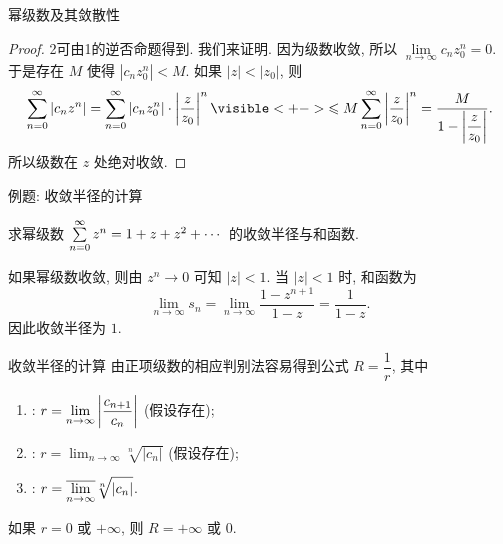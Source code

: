 \begin{frame}{幂级数及其敛散性}
\begin{center}
\end{center}
\onslide<+->
\begin{proof}
\enumnum2可由\enumnum1的逆否命题得到.
\onslide<+->
我们来证明. 因为级数收敛, 所以 $\lim\limits_{n\to\infty}c_n z_0^n=0$.
\onslide<+->
于是存在 $M$ 使得 $|c_nz_0^n|<M$.
\onslide<+->
如果 $|z|<|z_0|$, 则
\[\sum_{n=0}^\infty|c_nz^n|=\sum_{n=0}^\infty|c_nz_0^n|\cdot\abs{\frac z{z_0}}^n
\visible<+->{\le M\sum_{n=0}^\infty\abs{\frac z{z_0}}^n
=\frac{M}{1-\abs{\dfrac z{z_0}}}.}\]
\onslide<+->
所以级数在 $z$ 处绝对收敛.
\end{proof}
\end{frame}


\begin{frame}{例题: 收敛半径的计算}
\begin{example}
求幂级数 $\sum\limits_{n=0}^\infty z^n=1+z+z^2+\cdots$ 的收敛半径与和函数.
\end{example}
\begin{solution}
如果幂级数收敛, 则由 $z^n\to0$ 可知 $|z|<1$.
\onslide<+->
当 $|z|<1$ 时, 和函数为
\[\lim_{n\to\infty}s_n=\lim_{n\to\infty}\frac{1-z^{n+1}}{1-z}=\frac1{1-z}.\]
\onslide<+->
因此收敛半径为 $1$.
\end{solution}
\end{frame}


\begin{frame}{收敛半径的计算}
\onslide<+->
由正项级数的相应判别法容易得到公式 $R=\dfrac1r$, 其中
\begin{enumerate}
\item {}: $r=\displaystyle\lim_{n\to\infty}\left|\frac{c_{n+1}}{c_n}\right|$ (假设存在);
\item {}: $r=\displaystyle\lim_{n\to\infty}\sqrt[n]{|c_n|}$ (假设存在);
\item {}: $r=\displaystyle\overline{\lim_{n\to\infty}} \sqrt[n]{|c_n|}$.
\end{enumerate}
\onslide<+->
如果 $r=0$ 或 $+\infty$, 则 $R=+\infty$ 或 $0$.
\end{frame}


